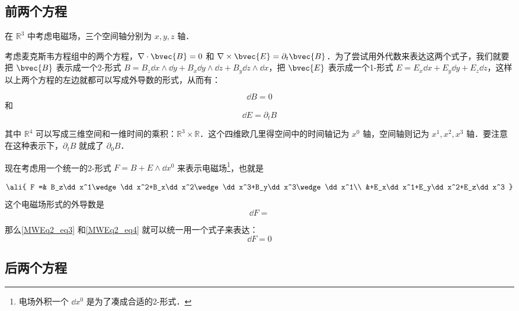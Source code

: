 

\subsection{前两个方程}



在 $\mathbb{R}^3$ 中考虑电磁场，三个空间轴分别为 $x, y, z$ 轴．

考虑麦克斯韦方程组中的两个方程，$\nabla\cdot\bvec{B}=0$ 和 $\nabla\times\bvec{E}=\partial_t\bvec{B}$．为了尝试用外代数来表达这两个式子，我们就要把 $\bvec{B}$
表示成一个2-形式 $B=B_z\dd x\wedge\dd y+B_x\dd y\wedge\dd z+B_y\dd z\wedge\dd x$，把 $\bvec{E}$ 表示成一个1-形式 $E=E_x\dd x+E_y\dd y+E_z\dd z$，这样以上两个方程的左边就都可以写成外导数的形式，从而有：

\begin{equation}\label{MWEq2_eq3}
\dd B=0
\end{equation}
和
\begin{equation}\label{MWEq2_eq4}
\dd E=\partial_tB
\end{equation}

其中 $\mathbb{R}^4$ 可以写成三维空间和一维时间的乘积：$\mathbb{R}^3\times\mathbb{R}$．这个四维欧几里得空间中的时间轴记为 $x^0$ 轴，空间轴则记为 $x^1, x^2, x^3$ 轴．要注意在这种表示下，$\partial_tB$ 就成了 $\partial_0B$．

现在考虑用一个统一的2-形式 $F=B+E\wedge\dd x^0$ 来表示电磁场\footnote{电场外积一个 $\dd x^0$ 是为了凑成合适的2-形式．}，也就是

\begin{equation}
\ali{
    F =& B_z\dd x^1\wedge\dd x^2+B_x\dd x^2\wedge\dd x^3+B_y\dd x^3\wedge\dd x^1\\
    &+E_x\dd x^1+E_y\dd x^2+E_z\dd x^3
}
\end{equation}
这个电磁场形式的外导数是
\begin{equation}
\dd F = 
\end{equation}

那么\autoref{MWEq2_eq3} 和\autoref{MWEq2_eq4} 就可以统一用一个式子来表达：
\begin{equation}
\dd F = 0
\end{equation}






\subsection{后两个方程}










